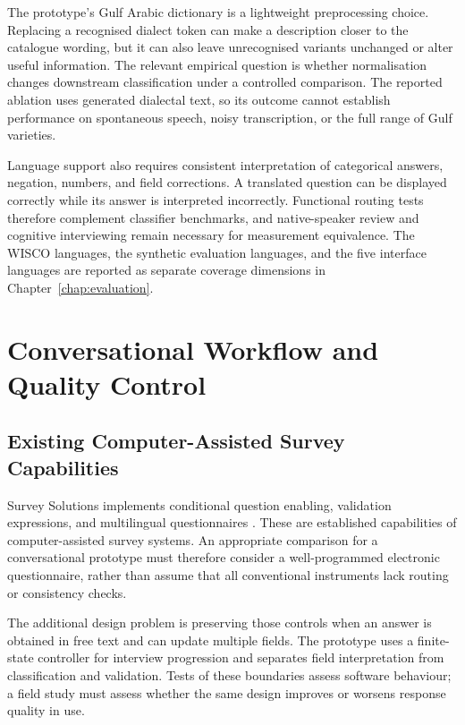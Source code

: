 The prototype's Gulf Arabic dictionary is a lightweight preprocessing
choice. Replacing a recognised dialect token can make a description
closer to the catalogue wording, but it can also leave unrecognised
variants unchanged or alter useful information. The relevant empirical
question is whether normalisation changes downstream classification
under a controlled comparison. The reported ablation uses generated
dialectal text, so its outcome cannot establish performance on spontaneous
speech, noisy transcription, or the full range of Gulf varieties.

Language support also requires consistent interpretation of categorical
answers, negation, numbers, and field corrections. A translated question
can be displayed correctly while its answer is interpreted incorrectly.
Functional routing tests therefore complement classifier benchmarks,
and native-speaker review and cognitive interviewing remain necessary
for measurement equivalence. The WISCO languages, the synthetic
evaluation languages, and the five interface languages are reported as
separate coverage dimensions in Chapter~\ref{chap:evaluation}.

\section{Conversational Workflow and Quality Control}
\label{sec:rw-multiagent}

\subsection{Existing Computer-Assisted Survey Capabilities}

Survey Solutions implements conditional question enabling, validation
expressions, and multilingual questionnaires
\cite{worldbank2016surveysolutionsvalidation,worldbank2026surveysolutionslanguages}.
These are established capabilities of computer-assisted survey systems.
An appropriate comparison for a conversational prototype must therefore
consider a well-programmed electronic questionnaire, rather than assume
that all conventional instruments lack routing or consistency checks.

The additional design problem is preserving those controls when an answer
is obtained in free text and can update multiple fields. The prototype
uses a finite-state controller for interview progression and separates
field interpretation from classification and validation. Tests of these
boundaries assess software behaviour; a field study must assess whether
the same design improves or worsens response quality in use.

